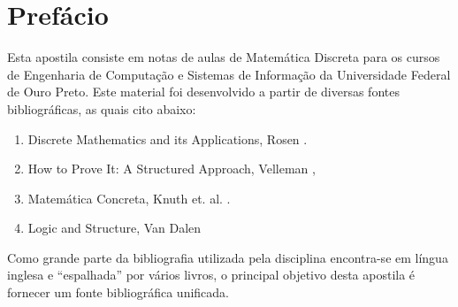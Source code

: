 \chapter*{Prefácio}

Esta apostila consiste em notas de aulas de Matemática Discreta para
os cursos de Engenharia de Computação e Sistemas de Informação da
Universidade Federal de Ouro Preto. Este material foi desenvolvido a
partir de diversas fontes bibliográficas, as quais cito abaixo:
\begin{enumerate}
  \item Discrete Mathematics and its Applications, Rosen \cite{Rosen02}.
  \item How to Prove It: A Structured Approach, Velleman
    \cite{Velleman06},
  \item Matemática Concreta, Knuth et. al. \cite{Graham94}.
  \item Logic and Structure, Van Dalen \cite{Dalen94}
\end{enumerate}

Como grande parte da bibliografia utilizada pela disciplina
encontra-se em língua inglesa e ``espalhada'' por vários livros,
o principal objetivo desta apostila é fornecer um fonte bibliográfica
unificada.